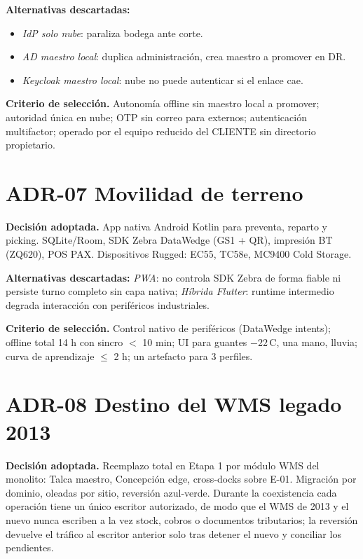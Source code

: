 \textbf{Alternativas descartadas:}

\begin{itemize}
  \item \emph{IdP solo nube}: paraliza bodega ante corte.
  \item \emph{AD maestro local}: duplica administración, crea maestro a promover en DR.
  \item \emph{Keycloak maestro local}: nube no puede autenticar si el enlace cae.
\end{itemize}

\textbf{Criterio de selección.} Autonomía offline sin maestro local a promover; autoridad única en nube; OTP sin correo para externos; autenticación multifactor; operado por el equipo reducido del CLIENTE sin directorio propietario.

\section{ADR-07 \textperiodcentered{} Movilidad de terreno}
\label{sub:adr-07}

\textbf{Decisión adoptada.} App nativa Android Kotlin para preventa, reparto y picking. SQLite/Room, SDK Zebra DataWedge (GS1 + QR), impresión BT (ZQ620), POS PAX. Dispositivos Rugged: EC55, TC58e, MC9400 Cold Storage.

\textbf{Alternativas descartadas:} \emph{PWA}: no controla SDK Zebra de forma fiable ni persiste turno completo sin capa nativa; \emph{Híbrida Flutter}: runtime intermedio degrada interacción con periféricos industriales.

\textbf{Criterio de selección.} Control nativo de periféricos (DataWedge intents); offline total 14 h con sincro $<$ 10 min; UI para guantes $-$22\,\textdegree{}C, una mano, lluvia; curva de aprendizaje $\leq$ 2 h; un artefacto para 3 perfiles.

\section{ADR-08 \textperiodcentered{} Destino del WMS legado 2013}
\label{sub:adr-08}

\textbf{Decisión adoptada.} Reemplazo total en Etapa 1 por módulo WMS del monolito: Talca maestro, Concepción edge, cross-docks sobre E-01. Migración por dominio, oleadas por sitio, reversión azul-verde. Durante la coexistencia cada operación tiene un único escritor autorizado, de modo que el WMS de 2013 y el nuevo nunca escriben a la vez stock, cobros o documentos tributarios; la reversión devuelve el tráfico al escritor anterior solo tras detener el nuevo y conciliar los pendientes.

